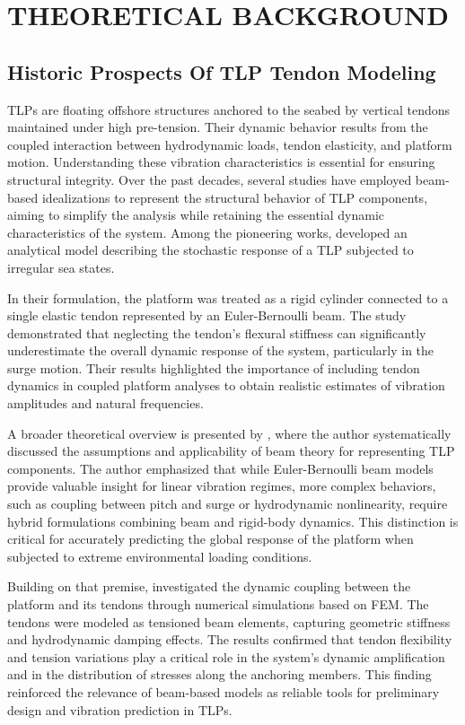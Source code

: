 \section{THEORETICAL BACKGROUND}

\subsection{Historic Prospects Of TLP Tendon Modeling}

TLPs are floating offshore structures anchored to the seabed by vertical tendons maintained under high pre-tension. Their dynamic behavior results from the coupled interaction between hydrodynamic loads, tendon elasticity, and platform motion. Understanding these vibration characteristics is essential for ensuring structural integrity. Over the past decades, several studies have employed beam-based idealizations to represent the structural behavior of TLP components, aiming to simplify the analysis while retaining the essential dynamic characteristics of the system. Among the pioneering works, \textcite{Adrezin1999} developed an analytical model describing the stochastic response of a TLP subjected to irregular sea states.

In their formulation, the platform was treated as a rigid cylinder connected to a single elastic tendon represented by an Euler-Bernoulli beam. The study demonstrated that neglecting the tendon's flexural stiffness can significantly underestimate the overall dynamic response of the system, particularly in the surge motion. Their results highlighted the importance of including tendon dynamics in coupled platform analyses to obtain realistic estimates of vibration amplitudes and natural frequencies.

A broader theoretical overview is presented by \textcite{Chakrabarti2005}, where the author systematically discussed the assumptions and applicability of beam theory for representing TLP components. The author emphasized that while Euler-Bernoulli beam models provide valuable insight for linear vibration regimes, more complex behaviors, such as coupling between pitch and surge or hydrodynamic nonlinearity, require hybrid formulations combining beam and rigid-body dynamics. This distinction is critical for accurately predicting the global response of the platform when subjected to extreme environmental loading conditions.

Building on that premise, \textcite{oyejobi2018} investigated the dynamic coupling between the platform and its tendons through numerical simulations based on FEM. The tendons were modeled as tensioned beam elements, capturing geometric stiffness and hydrodynamic damping effects. The results confirmed that tendon flexibility and tension variations play a critical role in the system's dynamic amplification and in the distribution of stresses along the anchoring members. This finding reinforced the relevance of beam-based models as reliable tools for preliminary design and vibration prediction in TLPs.

